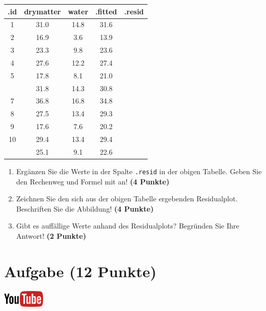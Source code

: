 \documentclass[a4paper, 9pt]{scrartcl}\usepackage[]{graphicx}\usepackage[]{xcolor}
\newenvironment{knitrout}{}{} %
\begin{document}
\begin{knitrout}
\color{fgcolor}\begin{table}[!h]
\centering\begingroup\fontsize{12}{14}\selectfont

\begin{tabular}{ccccc}
\toprule
.id & drymatter & water & .fitted & .resid\\
\midrule
1 & 31.0 & 14.8 & 31.6 & \\
2 & 16.9 & 3.6 & 13.9 & \\
3 & 23.3 & 9.8 & 23.6 & \\
4 & 27.6 & 12.2 & 27.4 & \\
5 & 17.8 & 8.1 & 21.0 & \\
\addlinespace
6 & 31.8 & 14.3 & 30.8 & \\
7 & 36.8 & 16.8 & 34.8 & \\
8 & 27.5 & 13.4 & 29.3 & \\
9 & 17.6 & 7.6 & 20.2 & \\
10 & 29.4 & 13.4 & 29.4 & \\
\addlinespace
11 & 25.1 & 9.1 & 22.6 & \\
\bottomrule
\end{tabular}
\endgroup{}
\end{table}

\end{knitrout}

\begin{enumerate}
\item Erg{\"a}nzen Sie die Werte in der Spalte \texttt{.resid} in der obigen
  Tabelle. Geben Sie den Rechenweg und Formel mit an! \textbf{(4 Punkte)}
\item Zeichnen Sie den sich aus der obigen Tabelle ergebenden
  Residualplot. Beschriften Sie die Abbildung! \textbf{(4 Punkte)}
\item Gibt es auff{\"a}llige Werte anhand des Residualplots? Begr{\"u}nden Sie Ihre
  Antwort! \textbf{(2 Punkte)}
\end{enumerate}
 
\clearpage

\section{Aufgabe \hfill (12 Punkte)}

\hfill\href{https://youtu.be/lHzRgm7hPw0}{\includegraphics[width =
  2cm]{img/youtube}}\\[1Ex]
\end{document}
